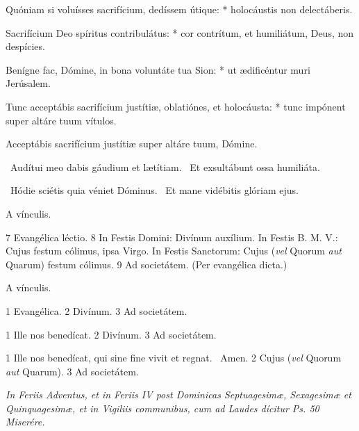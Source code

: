Quóniam si voluísses sacrifícium, dedíssem útique: * holocáustis non delectáberis.

Sacrifícium Deo spíritus contribulátus: * cor contrítum, et humiliátum, Deus, non despícies.

Benígne fac, Dómine, in bona voluntáte tua Sion: * ut ædificéntur muri Jerúsalem.

Tunc acceptábis sacrifícium justítiæ, oblatiónes, et holocáusta: * tunc impónent super altáre tuum vítulos.

 Acceptábis sacrifícium justítiæ super altáre tuum, Dómine.


\V\ Audítui meo dabis gáudium et lætítiam. \R\ Et exsultábunt ossa humiliáta.


\V\ Hódie sciétis quia véniet Dóminus. \R\ Et mane vidébitis glóriam ejus.


 A vínculis.

 7 Evangélica léctio. 8 In Festis Domini: Divínum auxílium. In Festis B. M. V.: Cujus festum cólimus, ipsa Virgo. In Festis Sanctorum: Cujus (\textit{vel} Quorum \textit{aut} Quarum) festum cólimus. 9 Ad societátem. (Per evangélica dicta.)


 A vínculis.


 1 Evangélica. 2 Divínum. 3 Ad societátem.


 1 Ille nos benedícat. 2 Divínum. 3 Ad societátem.


 1 Ille nos benedícat, qui sine fine vivit et regnat. \R\ Amen. 2 Cujus (\textit{vel} Quorum \textit{aut} Quarum). 3 Ad societátem.

\sectionornament



\textit{In Feriis Adventus, et in Feriis IV post Dominicas Septuagesimæ, Sexagesimæ et Quinquagesimæ, et in Vigiliis communibus, cum ad Laudes dícitur Ps. 50 Miserére.}

